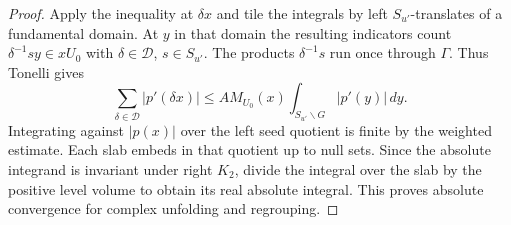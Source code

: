 \begin{proof}
Apply the inequality at \(\delta x\) and tile the integrals by
left \(S_{u'}\)-translates of a fundamental domain. At \(y\) in
that domain the resulting indicators count
\(\delta^{-1}s y\in xU_0\) with \(\delta\in\mathcal D\),
\(s\in S_{u'}\). The products \(\delta^{-1}s\) run once through
\(\Gamma\). Thus Tonelli gives
\[
 \sum_{\delta\in\mathcal D}|p'(\delta x)|
 \le A M_{U_0}(x)\int_{S_{u'}\backslash G}|p'(y)|\,dy .
\]
Integrating against \(|p(x)|\) over the left seed quotient is
finite by the weighted estimate. Each slab embeds in that quotient
up to null sets. Since the absolute integrand is invariant under
right \(K_2\), divide the integral over the slab by the positive
level volume to obtain its real absolute integral. This proves
absolute convergence for complex unfolding and regrouping.
\end{proof}
